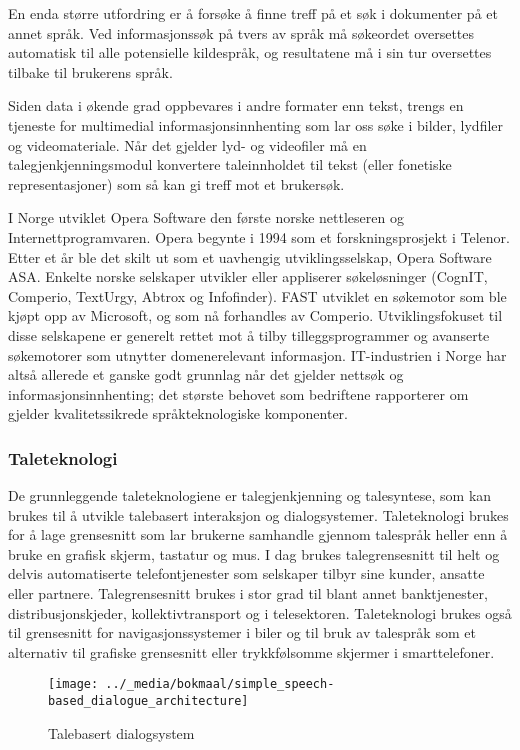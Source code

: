\begin{multicols}{2}
En enda større utfordring er å forsøke å finne treff på et søk i dokumenter på et annet språk. Ved informasjonssøk på tvers av språk må søkeordet oversettes automatisk til alle potensielle kildespråk, og resultatene må i sin tur oversettes tilbake til brukerens språk.   

Siden data i økende grad oppbevares i andre formater enn tekst, trengs en tjeneste for multimedial informasjonsinnhenting som lar oss søke i bilder, lydfiler og videomateriale. Når det gjelder lyd- og videofiler må en talegjenkjenningsmodul konvertere taleinnholdet til tekst (eller fonetiske representasjoner) som så kan gi treff mot et brukersøk.

I Norge utviklet Opera Software den første norske nettleseren og Internettprogramvaren. Opera begynte i 1994 som et forskningsprosjekt i Telenor. 
Etter et år ble det skilt ut som et uavhengig utviklingsselskap, Opera Software ASA. Enkelte norske selskaper utvikler eller appliserer søkeløsninger (CognIT, Comperio, TextUrgy, Abtrox og  Infofinder). 
FAST utviklet en søkemotor som ble kjøpt opp av Microsoft, og som nå forhandles av Comperio. 
Utviklingsfokuset til disse selskapene er generelt rettet mot å tilby tilleggsprogrammer og avanserte søkemotorer som utnytter domenerelevant informasjon.
IT-industrien i Norge har altså allerede et ganske godt grunnlag når det gjelder nettsøk og informasjonsinnhenting; det største behovet som bedriftene rapporterer om gjelder kvalitetssikrede språkteknologiske komponenter.

\subsubsection{Taleteknologi}

De grunnleggende taleteknologiene er talegjenkjenning og talesyntese, som kan brukes til å utvikle talebasert interaksjon og dialogsystemer. Taleteknologi brukes for å lage grensesnitt som lar brukerne samhandle gjennom talespråk heller enn å bruke en grafisk skjerm, tastatur og mus. I dag brukes talegrensesnitt til helt og delvis automatiserte telefontjenester som selskaper tilbyr sine kunder, ansatte eller partnere. Talegrensesnitt brukes i stor grad til blant annet banktjenester, distribusjonskjeder, kollektivtransport og i telesektoren. Taleteknologi brukes også til grensesnitt for navigasjonssystemer i biler og til bruk av talespråk som et alternativ til grafiske grensesnitt eller trykkfølsomme skjermer i smarttelefoner.  

\begin{figure*}[htb]
  \center
  \texttt{[image: ../\_media/bokmaal/simple\_speech-based\_dialogue\_architecture]}
  \caption{Talebasert dialogsystem}
  \label{fig:dialoguearch_no}
\end{figure*}


\end{multicols}
